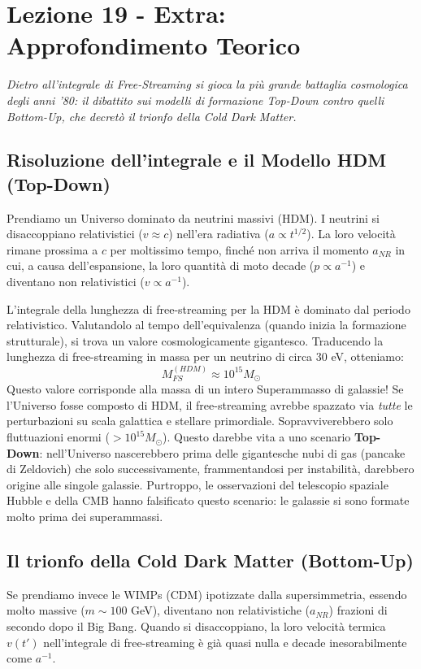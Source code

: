 \documentclass[11pt,a4paper]{report}
\begin{document}
\newpage
\section{Lezione 19 - Extra: Approfondimento Teorico}

\textit{Dietro all'integrale di Free-Streaming si gioca la più grande battaglia cosmologica degli anni '80: il dibattito sui modelli di formazione Top-Down contro quelli Bottom-Up, che decretò il trionfo della Cold Dark Matter.}

\subsection{Risoluzione dell'integrale e il Modello HDM (Top-Down)}
Prendiamo un Universo dominato da neutrini massivi (HDM). I neutrini si disaccoppiano relativistici ($v \approx c$) nell'era radiativa ($a \propto t^{1/2}$). La loro velocità rimane prossima a $c$ per moltissimo tempo, finché non arriva il momento $a_{NR}$ in cui, a causa dell'espansione, la loro quantità di moto decade ($p \propto a^{-1}$) e diventano non relativistici ($v \propto a^{-1}$).

L'integrale della lunghezza di free-streaming per la HDM è dominato dal periodo relativistico. Valutandolo al tempo dell'equivalenza (quando inizia la formazione strutturale), si trova un valore cosmologicamente gigantesco. Traducendo la lunghezza di free-streaming in massa per un neutrino di circa $30$ eV, otteniamo:
\begin{equation}
M_{FS}^{(HDM)} \approx 10^{15} M_\odot
\end{equation}
Questo valore corrisponde alla massa di un intero Superammasso di galassie!
Se l'Universo fosse composto di HDM, il free-streaming avrebbe spazzato via \textit{tutte} le perturbazioni su scala galattica e stellare primordiale. Sopravviverebbero solo fluttuazioni enormi ($>10^{15} M_\odot$). Questo darebbe vita a uno scenario \textbf{Top-Down}: nell'Universo nascerebbero prima delle gigantesche nubi di gas (pancake di Zeldovich) che solo successivamente, frammentandosi per instabilità, darebbero origine alle singole galassie. Purtroppo, le osservazioni del telescopio spaziale Hubble e della CMB hanno falsificato questo scenario: le galassie si sono formate molto prima dei superammassi.

\subsection{Il trionfo della Cold Dark Matter (Bottom-Up)}
Se prendiamo invece le WIMPs (CDM) ipotizzate dalla supersimmetria, essendo molto massive ($m \sim 100$ GeV), diventano non relativistiche ($a_{NR}$) frazioni di secondo dopo il Big Bang.
Quando si disaccoppiano, la loro velocità termica $v(t')$ nell'integrale di free-streaming è già quasi nulla e decade inesorabilmente come $a^{-1}$.
\end{document}
